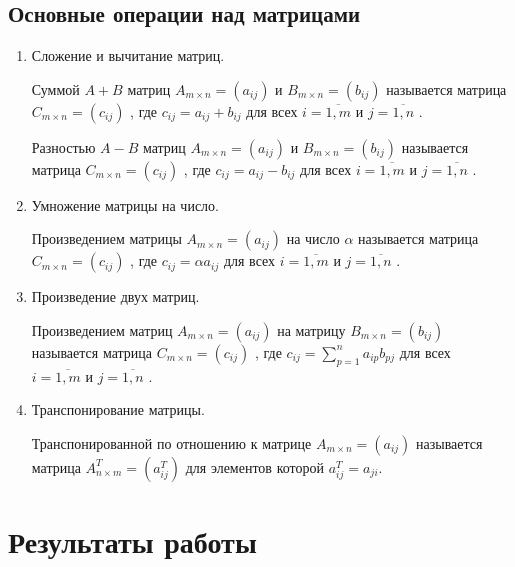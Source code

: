 \documentclass[spec, och, labwork]{shiza}
\begin{document}
    \subsection{Основные операции над матрицами}

    \begin{enumerate}
        \item Сложение и вычитание матриц.
        
        Суммой $A + B$ матриц $A_{m \times n} = (a_{ij}) \text{ и }B_{m \times n} = (b_{ij})$ называется матрица 
        $C_{m \times n} = (c_{ij})$ , где $c_{ij} = a_{ij} + b_{ij}$ для всех $i = \overline{1, m} \text{ и } j = \overline{1, n}$ .

        Разностью $A - B$ матриц $A_{m \times n} = (a_{ij}) \text{ и }B_{m \times n} = (b_{ij})$ называется матрица 
        $C_{m \times n} = (c_{ij})$ , где $c_{ij} = a_{ij} - b_{ij}$ для всех $i = \overline{1, m} \text{ и } j = \overline{1, n}$ .
        \item Умножение матрицы на число.
        
        Произведением матрицы $A_{m \times n} = (a_{ij}) \text{ на число } \alpha$ называется матрица 
        $C_{m \times n} = (c_{ij})$ , где $c_{ij} = \alpha a_{ij}$ для всех $i = \overline{1, m} \text{ и } j = \overline{1, n}$ .
        \item Произведение двух матриц.
        
        Произведением матриц $A_{m \times n} = (a_{ij}) \text{ на матрицу }B_{m \times n} = (b_{ij})$ называется матрица 
        $C_{m \times n} = (c_{ij})$ , где $c_{ij} = \sum\limits_{p=1}^n a_{ip}b_{pj}$ для всех $i = \overline{1, m} \text{ и } j = \overline{1, n}$ .
        \item Транспонирование матрицы.
        
        Транспонированной по отношению к матрице $A_{m \times n} = (a_{ij})$ называется матрица $A^T_{n \times m} = (a^T_{ij})$
        для элементов которой $a^T_{ij} = a_{ji}$.
    \end{enumerate}

\section{Результаты работы}
\end{document}
